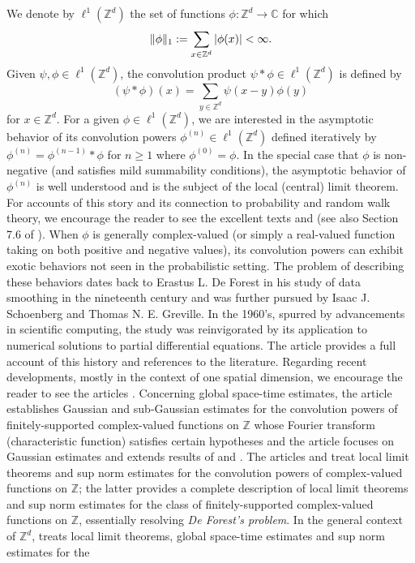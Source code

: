 \documentclass[11pt, letter]{book}
\begin{document}
We denote by $\ell^1(\mathbb{Z}^d)$ the set of functions $\phi:\mathbb{Z}^d\to\mathbb{C}$ for which
\begin{equation*}
\|\phi\|_1:=\sum_{x\in\mathbb{Z}^d}\abs{\phi(x)}<\infty.
\end{equation*}
Given $\psi,\phi\in \ell^1(\mathbb{Z}^d)$, the convolution product $\psi\ast\phi\in\ell^1(\mathbb{Z}^d)$ is defined by
\begin{equation*}
\left(\psi\ast\phi\right)(x)=\sum_{y\in\mathbb{Z}^d}\psi(x-y)\phi(y)
\end{equation*}
for $x\in\mathbb{Z}^d$. For a given $\phi\in\ell^1(\mathbb{Z}^d)$, we are interested in the asymptotic behavior of its convolution powers $\phi^{(n)}\in\ell^1(\mathbb{Z}^d)$ defined iteratively by $\phi^{(n)}=\phi^{(n-1)}\ast\phi$ for $n\geq 1$ where $\phi^{(0)}=\phi$. In the special case that $\phi$ is non-negative (and satisfies mild summability conditions), the asymptotic behavior of $\phi^{(n)}$ is well understood and is the subject of the local (central) limit theorem. For accounts of this story and its connection to probability and random walk theory, we encourage the reader to see the excellent texts \cite{lawler_random_2010} and \cite{spitzer_principles_1964} (see also Section 7.6 of \cite{randles_convolution_2017}). When $\phi$ is generally complex-valued (or simply a real-valued function taking on both positive and negative values), its convolution powers can exhibit exotic behaviors not seen in the probabilistic setting. The problem of describing these behaviors dates back to Erastus L. De Forest in his study of data smoothing in the nineteenth century and was further pursued by Isaac J. Schoenberg and Thomas N. E.  Greville. In the 1960's, spurred by advancements in scientific computing, the study was reinvigorated by its application to numerical solutions to partial differential equations. The article \cite{diaconis_convolution_2014} provides a full account of this history and references to the literature. Regarding recent developments, mostly in the context of one spatial dimension, we encourage the reader to see the articles \cite{diaconis_convolution_2014,randles_convolution_2015, coulombel2020generalized, randles_convolution_2017}. Concerning global space-time estimates, the article \cite{diaconis_convolution_2014} establishes Gaussian and sub-Gaussian estimates for the convolution powers of finitely-supported complex-valued functions on $\mathbb{Z}$ whose Fourier transform (characteristic function) satisfies certain hypotheses and the article \cite{coulombel2020generalized} focuses on Gaussian estimates and extends results of \cite{diaconis_convolution_2014} and \cite{randles_convolution_2017}. The articles \cite{diaconis_convolution_2014} and \cite{randles_convolution_2015} treat local limit theorems and sup norm estimates for the convolution powers of complex-valued functions on $\mathbb{Z}$; the latter provides a complete description of local limit theorems and sup norm estimates for the class of finitely-supported complex-valued functions on $\mathbb{Z}$, essentially resolving \textit{De Forest's problem}. In the general context of $\mathbb{Z}^d$, \cite{randles_convolution_2017} treats local limit theorems, global space-time estimates and sup norm estimates for the 
\end{document}

